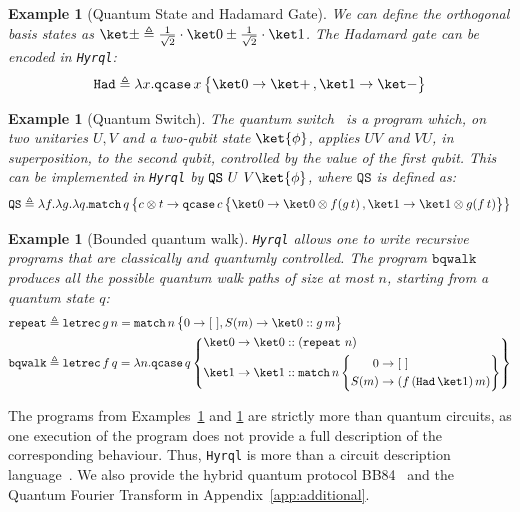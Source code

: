 \documentclass[10pt,a4paper]{article}
\newcommand{\nil}{[~]}
\newcommand{\textqcase}{\ensuremath{\mathtt{qcase}}}
\newcommand{\textmatch}{\ensuremath{\mathtt{match}}}
\newcommand{\textletrec}{\ensuremath{\mathtt{letrec}}}
\newcommand{\zket}{\ket 0}
\newcommand{\oket}{\ket 1}
\newcommand{\qcasebase}[2]{
  \textqcase\,#1\left\{\! \begin{aligned} #2 \end{aligned}\right\}
}
\newcommand{\qcase}[3]{
  \qcasebase {#1} {\zket \to #2\,, \oket \to #3}
}
\newcommand{\qcasesplit}[3]{
  \qcasebase {#1} { 
    \begin{aligned} 
      \zket &\to #2 \\ \oket &\to #3 
    \end{aligned}
  }
}
\newcommand{\match}[2]{
  \textmatch\,#1\left\{\! \begin{aligned} #2 \end{aligned}\right\}
}
\newcommand{\lbd}[2]{\lambda #1 .#2}
\newcommand{\letrec}[3]{\textletrec\,#1\,#2=#3}
\newcommand{\QS}{\ensuremath{\mathtt{QS}}}
\newcommand{\hyrql}{{{\tt{Hyrql}}}}
\newtheorem{example}[theorem]{Example}
\begin{document}
\endgroup

\begin{example}[Quantum State and Hadamard Gate]
  \label{ex:had-syntax}
  We can define the orthogonal basis states as $\ket \pm \triangleq
  \frac{1}{\sqrt 2} \cdot \zket \pm \frac{1}{\sqrt 2} \cdot \oket$. The
  Hadamard gate can be encoded in \hyrql{}:
  \[
    \mathtt{Had} \triangleq \lbd x \qcase x {\ket +} {\ket -}
  \]
\end{example}

\begin{example}[Quantum Switch]
  \label{ex:qs-syntax}
  The quantum switch~\cite{CAPV13} is a program which, on two unitaries $U, V$
  and a two-qubit state $\ket{\phi}$, applies $UV$ and $VU$, in superposition,
  to the second qubit, controlled by the value of the first qubit. This can be
  implemented in \hyrql{} by $\QS\ U\ V \ket{\phi}$, where $\QS$ is defined as:
  \[
    \QS{} \triangleq\lbd f\lbd g\lbd q \match q { c \otimes t \to
      \qcase{c}{\zket \otimes f(g\,t)}{ \oket \otimes g(f\,t)}
    }
  \]
\end{example}

\begin{example}[Bounded quantum walk]
  \label{ex:bqwalk}
  \hyrql{} allows one to write recursive programs that are classically and
  quantumly controlled. The program $\mathtt{bqwalk}$ produces all the possible
  quantum walk paths of size at most $n$, starting from a quantum state $q$:
  \[
    \begin{aligned}
      \mathtt{repeat} &\triangleq \letrec g n \match n {
        0 \to \nil,
        S(m) \to \zket :: g\,m
      } \\
      \mathtt{bqwalk} &\triangleq \letrec f q \lbd n \qcasesplit q {
        \zket::(\mathtt{repeat}~n)
      } {
        \oket :: 
        \match n {
          0 &\to \nil \\
          S(m) &\to (f\,(\mathtt{Had}\,\oket)\,m)
        }
      }
    \end{aligned}
  \]
\end{example}

The programs from Examples~\ref{ex:qs-syntax} and \ref{ex:bqwalk} are strictly
more than quantum circuits, as one execution of the program does not provide a
full description of the corresponding behaviour. Thus, \hyrql{} is more than a
circuit description language~\cite{GLRSV13}. We also provide the hybrid quantum
protocol BB84~\cite{BB84} and the Quantum Fourier Transform in
Appendix~\ref{app:additional}.
\end{document}
